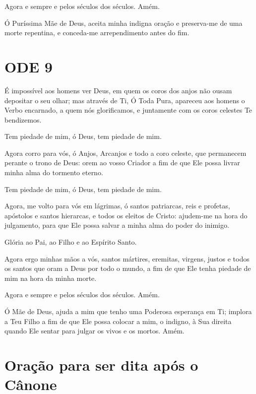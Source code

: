 \documentclass{subfiles}
\begin{document}
Agora e sempre e pelos séculos dos séculos. Amém.

\theotokion{}Ó Puríssima Mãe de Deus, aceita minha indigna oração e
preserva-me de uma morte repentina, e conceda-me arrependimento antes
do fim.

\section{ODE 9}

\eirmos{}É impossível aos homens ver Deus, em quem os coros dos anjos não
ousam depositar o seu olhar; mas através de Ti, Ó Toda Pura, apareceu aos
homens o Verbo encarnado, a quem nós glorificamos, e juntamente com os
coros celestes Te bendizemos.

Tem piedade de mim, ó Deus, tem piedade de mim.

Agora corro para vós, ó Anjos, Arcanjos e todo a coro celeste, que
permanecem perante o trono de Deus: orem ao vosso Criador a fim de que Ele
possa livrar minha alma do tormento eterno.

Tem piedade de mim, ó Deus, tem piedade de mim.

Agora, me volto para vós em lágrimas, ó santos patriarcas, reis e
profetas, apóstolos e santos hierarcas, e todos os eleitos de Cristo: ajudem-me
na hora do julgamento, para que Ele possa salvar a minha alma do poder do
inimigo.

Glória ao Pai, ao Filho e ao Espírito Santo.

Agora ergo minhas mãos a vós, santos mártires, eremitas, virgens,
justos e todos os santos que oram a Deus por todo o mundo, a fim de que Ele
tenha piedade de mim na hora da minha morte.

Agora e sempre e pelos séculos dos séculos. Amém.

\theotokion{}Ó Mãe de Deus, ajuda a mim que tenho uma Poderosa esperança
em Ti; implora a Teu Filho a fim de que Ele possa colocar a mim, o indigno, à
Sua direita quando Ele sentar para julgar os vivos e os mortos. Amém.

\section{Oração para ser dita após o Cânone}
\end{document}
